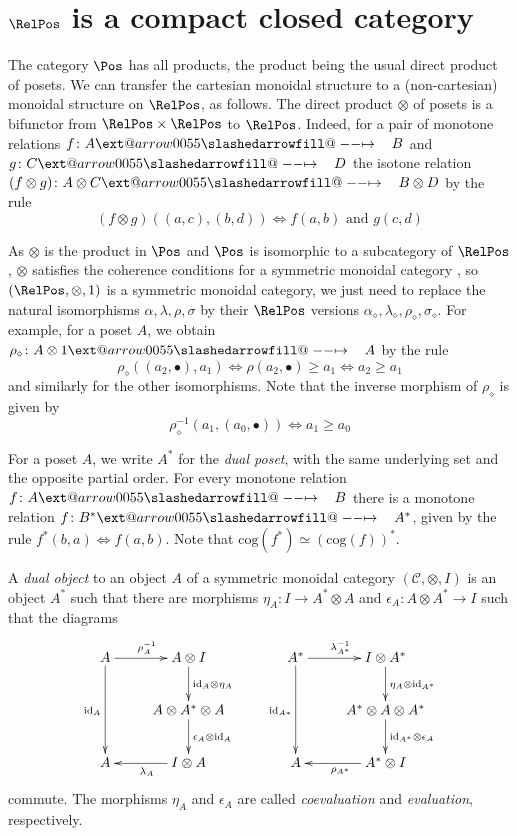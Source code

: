 \documentclass{article}
\makeatletter
\theoremstyle{definition}
\newcommand{\cog}{\mathrm{cog}}
\newcommand{\id}{\mathrm{id}}
\newcommand{\C}{\mathcal{C}}
\newcommand{\ladj}[1]{{#1}_\diamond}
\newcommand{\sto}{\xslashedrightarrow{\hskip 1pc}}
\def\slashedarrowfill@#1#2#3#4#5{%
  $\m@th\thickmuskip0mu\medmuskip\thickmuskip\thinmuskip\thickmuskip
  \relax#5#1\mkern-7mu%
  \cleaders\hbox{$#5\mkern-2mu#2\mkern-2mu$}\hfill
  \mathclap{#3}\mathclap{#2}%
  \cleaders\hbox{$#5\mkern-2mu#2\mkern-2mu$}\hfill
  \mkern-7mu#4$%
}
\def\rightslashedarrowfill@{%
  \slashedarrowfill@\relbar\relbar\mapstochar\rightarrow}
\newcommand\xslashedrightarrow[2][]{%
  \ext@arrow 0055{\rightslashedarrowfill@}{#1}{#2}}
\makeatother
\begin{document}
\section{$\RelPos$ is a compact closed category}

The category $\Pos$ has all products, the product being the usual direct product
of posets. We can transfer
the cartesian monoidal structure to a (non-cartesian) monoidal structure
on $\RelPos$, as follows.
The direct product $\otimes$ of posets is a bifunctor from
$\RelPos\times\RelPos$ to $\RelPos$. Indeed, for a pair of monotone relations
$f\colon A\sto B$ and $g\colon C\sto D$ the isotone relation $(f\otimes g)\colon
A\otimes C\sto B\otimes D$ by the rule
$$
(f\otimes g)((a,c),(b,d)) \Leftrightarrow f(a,b)\text{ and }g(c,d)
$$


As $\otimes$ is the product in $\Pos$ and $\Pos$ is isomorphic to a subcategory of $\RelPos$,
$\otimes$ satisfies the coherence conditions for a symmetric monoidal category
\cite[Chapter VII]{mac1998categories}, so $(\RelPos,\otimes,1)$ is a symmetric
monoidal category, we just need to replace the natural isomorphisms
$\alpha,\lambda,\rho,\sigma$ by their $\RelPos$ versions
$\ladj\alpha,\ladj\lambda,\ladj\rho,\ladj\sigma$. For example, for a poset $A$,
we obtain $\ladj\rho\colon A\otimes 1\sto A$ by the rule 
$$
\ladj\rho((a_2,\bullet),a_1)\Leftrightarrow \rho(a_2,\bullet)\geq
a_1\Leftrightarrow a_2\geq a_1
$$
and similarly for the other isomorphisms. Note that the inverse morphism of
$\ladj\rho$ is given by
$$
\ladj\rho^{-1}(a_1,(a_0,\bullet))\Leftrightarrow a_1\geq a_0
$$ 

For a poset $A$, we write $A^*$ for the {\em dual poset}, with the same underlying
set and the opposite partial order. For every monotone relation $f\colon A\sto B$
there is a monotone relation $f\colon B^*\sto A^*$, given by the rule
$f^*(b,a)\Leftrightarrow f(a,b)$. Note that $\cog(f^*)\simeq (\cog(f))^*$.

A {\em dual object} to an object $A$ of a symmetric monoidal category $(\C,\otimes,I)$ is an object
$A^*$ such that there are morphisms
$\eta_A\colon I\to A^*\otimes A$ and $\epsilon_A\colon A\otimes A^*\to I$ such
that the diagrams
\begin{equation}
\label{diag:compact}
\xymatrix{
A
	\ar[r]^{\rho_A^{-1}}
	\ar[dd]_{\id_A}
&
A\otimes I
	\ar[d]^{\id_A\otimes\eta_A}
\\
~
&
A\otimes A^*\otimes A
	\ar[d]^{\epsilon_A\otimes\id_A}
\\
A
&
I\otimes A
	\ar[l]^{\lambda_A}
}
\qquad
\xymatrix{
A^*
	\ar[r]^{\lambda_{A^*}^{-1}}
	\ar[dd]_{\id_{A*}}
&
I\otimes A^*
	\ar[d]^{\eta_A\otimes\id_{A^*}}
\\
~
&
A^*\otimes A\otimes A^*
	\ar[d]^{\id_{A^*}\otimes\epsilon_A}
\\
A
&
A^*\otimes I
	\ar[l]^{\rho_{A^*}}
}
\end{equation}
commute. The morphisms $\eta_A$ and $\epsilon_A$ are called {\em coevaluation} and
{\em evaluation}, respectively. 
\end{document}

